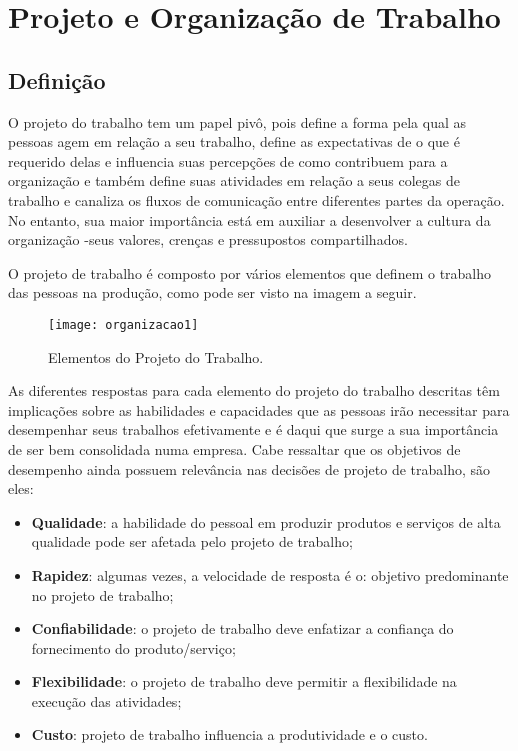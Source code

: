 \chapter[Projeto e Organização de Trabalho]{Projeto e Organização de Trabalho}
\label{chap:organizacao}

	\section[Definição]{Definição}
	\label{sec:organizacao_definicao}

		O projeto do trabalho tem um papel pivô, pois define a forma pela qual as pessoas agem em relação a seu trabalho, define as expectativas de o que é requerido delas e influencia suas percepções de como contribuem para a organização e também define suas atividades em relação a seus colegas de trabalho e canaliza os fluxos de comunicação entre diferentes partes da operação. No entanto, sua maior importância está em auxiliar a desenvolver a cultura da organização -seus valores, crenças e pressupostos compartilhados. \cite{slack}
		
		O projeto de trabalho é composto por vários elementos que definem o trabalho das pessoas na produção, como pode ser visto na imagem a seguir.

		\begin{figure}[h]
			\centering
			\texttt{[image: organizacao1]}
			\caption[Elementos do projeto do trabalho]{Elementos do Projeto do Trabalho. \cite{slack}}
			\label{fig:organizacao1}
		\end{figure}

		As diferentes respostas para cada elemento do projeto do trabalho descritas têm implicações sobre as habilidades e capacidades que as pessoas irão necessitar para desempenhar seus trabalhos efetivamente e é daqui que surge a sua importância de ser bem consolidada numa empresa. Cabe ressaltar que os objetivos de desempenho ainda possuem relevância nas decisões de projeto de trabalho, são eles:

		\begin{itemize}
			\item{\textbf{Qualidade}: a habilidade do pessoal em produzir produtos e serviços de alta qualidade pode ser afetada pelo projeto de trabalho;}
			\item{\textbf{Rapidez}: algumas vezes, a velocidade de resposta é o: objetivo predominante no projeto de trabalho;}
			\item{\textbf{Confiabilidade}: o projeto de trabalho deve enfatizar a confiança do fornecimento do produto/serviço;}
			\item{\textbf{Flexibilidade}: o projeto de trabalho deve permitir a flexibilidade na execução das atividades;}
			\item{\textbf{Custo}: projeto de trabalho influencia a produtividade e o custo.}
		\end{itemize}

